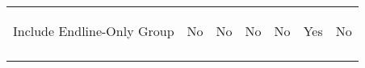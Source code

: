 \begin{center}
\begin{tabular}{lcccccc}
Include Endline-Only Group & \begin{footnotesize}No\end{footnotesize} & \begin{footnotesize}No\end{footnotesize} & \begin{footnotesize}No\end{footnotesize} & \begin{footnotesize}No\end{footnotesize} & \begin{footnotesize}Yes\end{footnotesize} & \begin{footnotesize}No\end{footnotesize}\\
\noalign{\smallskip}\hline\end{tabular}\\
\end{center}
